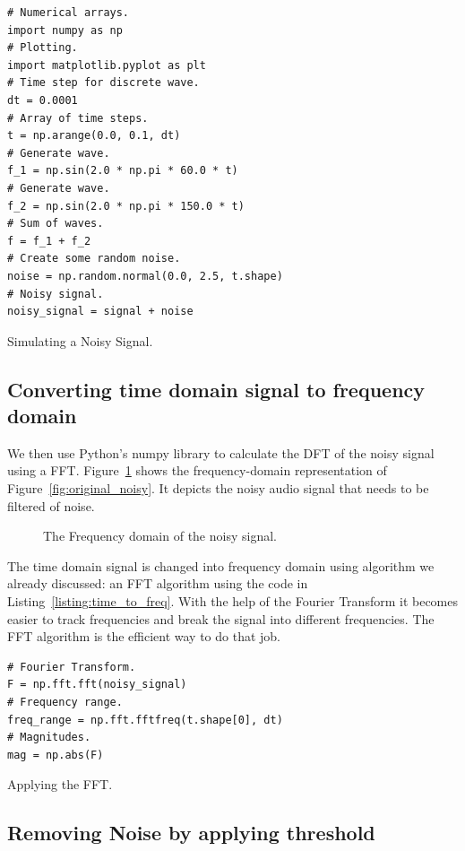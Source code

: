 \documentclass[a4paper, 12pt]{scrartcl}
\begin{document}
\begin{listing}[h]
  \begin{verbatim}
# Numerical arrays.
import numpy as np
# Plotting.
import matplotlib.pyplot as plt
# Time step for discrete wave.
dt = 0.0001
# Array of time steps.
t = np.arange(0.0, 0.1, dt)
# Generate wave.
f_1 = np.sin(2.0 * np.pi * 60.0 * t)
# Generate wave.
f_2 = np.sin(2.0 * np.pi * 150.0 * t)
# Sum of waves.
f = f_1 + f_2
# Create some random noise.
noise = np.random.normal(0.0, 2.5, t.shape)
# Noisy signal.
noisy_signal = signal + noise
  \end{verbatim}
  \caption{Simulating a Noisy Signal.}
  \label{listing:sixty}
  \end{listing}
  
\subsection{Converting time domain signal to frequency domain}
We then use Python's numpy library to calculate the DFT of the noisy signal using a FFT.
Figure~\ref{fig:time_to_freq} shows the frequency-domain representation of Figure~\ref{fig:original_noisy}.
It depicts the noisy audio signal that needs to be filtered of noise.
\begin{figure}[H] 
  \centering
  \resizebox{\textwidth}{!}{}
  \caption{The Frequency domain of the noisy signal.}
  \label{fig:time_to_freq}
\end{figure}
The time domain signal is changed into frequency domain using algorithm we already discussed: an FFT algorithm using the code in Listing~\ref{listing:time_to_freq}.
With the help of the Fourier Transform it becomes easier to track frequencies and break the signal into different frequencies.
The FFT algorithm is the efficient way to do that job.
\begin{listing}[h]
\begin{verbatim}
# Fourier Transform.
F = np.fft.fft(noisy_signal)
# Frequency range.
freq_range = np.fft.fftfreq(t.shape[0], dt)
# Magnitudes.
mag = np.abs(F)
\end{verbatim}
\caption{Applying the FFT.}
\label{listing:time_to_freq}
\end{listing}

\subsection{Removing Noise by applying threshold}
\end{document}
